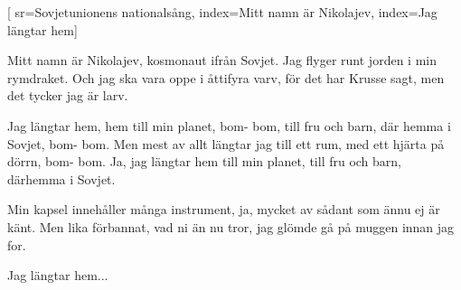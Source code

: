 [ 						
	sr={Sovjetunionens nationalsång},					
	index={Mitt namn är Nikolajev},
	index={Jag längtar hem}]		
	
\beginverse*						
Mitt namn är Nikolajev, 
kosmonaut ifrån Sovjet. 
Jag flyger runt jorden i min rymdraket. 
Och jag ska vara oppe i åttifyra varv, 
för det har Krusse sagt,
men det tycker jag är larv. 
\endverse						

\beginchorus				
Jag längtar hem, hem till min planet,
bom- bom,
till fru och barn, där hemma i Sovjet,
bom- bom.
Men mest av allt längtar jag till ett rum, 
med ett hjärta på dörrn,
bom- bom.
Ja, jag längtar hem till min planet, 
till fru och barn, därhemma i Sovjet. 
\endchorus	

\beginverse
Min kapsel innehåller många instrument,
ja, mycket av sådant som ännu ej är känt. 
Men lika förbannat, vad ni än nu tror, 
jag glömde gå på muggen innan jag for.
\endverse	

\beginchorus
Jag längtar hem...
\endchorus		
\endsong		
